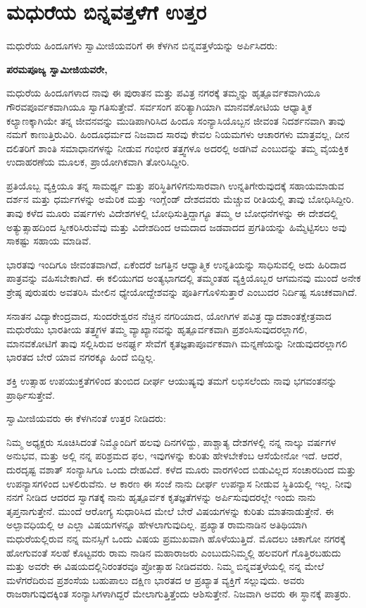 
\chapter{ಮಧುರೆಯ ಬಿನ್ನವತ್ತಳೆಗೆ ಉತ್ತರ}

ಮಧುರೆಯ ಹಿಂದೂಗಳು ಸ್ವಾಮೀಜಿಯವರಿಗೆ ಈ ಕೆಳಗಿನ ಬಿನ್ನವತ್ತಳೆಯನ್ನು ಅರ್ಪಿಸಿದರು:

\textbf{ಪರಮಪೂಜ್ಯ ಸ್ವಾಮೀಜಿಯವರೇ,}

ಮಧುರೆಯ ಹಿಂದೂಗಳಾದ ನಾವು ಈ ಪುರಾತನ ಮತ್ತು ಪವಿತ್ರ ನಗರಕ್ಕೆ ತಮ್ಮನ್ನು ಹೃತ್ಪೂರ್ವಕವಾಗಿಯೂ ಗೌರವಪೂರ್ವಕವಾಗಿಯೂ ಸ್ವಾಗತಿಸುತ್ತೇವೆ. ಸರ್ವಸಂಗ ಪರಿತ್ಯಾಗಿಯಾಗಿ ಮಾನವಕೋಟಿಯ ಆಧ್ಯಾತ್ಮಿಕ ಕಲ್ಯಾಣಕ್ಕಾಗಿಯೇ ತನ್ನ ಜೀವನವನ್ನು ಮುಡಿಪಾಗಿರಿಸಿದ ಹಿಂದೂ ಸಂನ್ಯಾಸಿಯೊಬ್ಬನ ಜೀವಂತ ನಿದರ್ಶನವಾಗಿ ತಾವು ನಮಗೆ ಕಾಣುತ್ತಿರುವಿರಿ. ಹಿಂದೂಧರ್ಮದ ನಿಜವಾದ ಸಾರವು ಕೇವಲ ನಿಯಮಗಳು ಆಚಾರಗಳು ಮಾತ್ರವಲ್ಲ, ದೀನ ದಲಿತರಿಗೆ ಶಾಂತಿ ಸಮಾಧಾನಗಳನ್ನು ನೀಡುವ ಗಂಭೀರ ತತ್ತ್ವಗಳೂ ಅದರಲ್ಲಿ ಅಡಗಿವೆ ಎಂಬುದನ್ನು ತಮ್ಮ ವೈಯಕ್ತಿಕ ಉದಾಹರಣೆಯ ಮೂಲಕ, ಪ್ರಾಯೋಗಿಕವಾಗಿ ತೋರಿಸಿದ್ದೀರಿ.

ಪ್ರತಿಯೊಬ್ಬ ವ್ಯಕ್ತಿಯೂ ತನ್ನ ಸಾಮರ್ಥ್ಯ ಮತ್ತು ಪರಿಸ್ಥಿತಿಗಳಿಗನುಸಾರವಾಗಿ ಉನ್ನತಿಗೇರುವುದಕ್ಕೆ ಸಹಾಯಮಾಡುವ ದರ್ಶನ ಮತ್ತು ಧರ್ಮಗಳನ್ನು ಅಮೆರಿಕ ಮತ್ತು ಇಂಗ್ಲೆಂಡ್​ ದೇಶದವರು ಮೆಚ್ಚುವ ರೀತಿಯಲ್ಲಿ ತಾವು ಬೋಧಿಸಿದ್ದೀರಿ. ತಾವು ಕಳೆದ ಮೂರು ವರ್ಷಗಳು ವಿದೇಶಗಳಲ್ಲಿ ಬೋಧಿಸುತ್ತಿದ್ದಾಗ್ಯೂ ತಮ್ಮ ಆ ಬೋಧನೆಗಳನ್ನು ಈ ದೇಶದಲ್ಲಿ ಅತ್ಯುತ್ಸಾಹದಿಂದ ಸ್ವೀಕರಿಸಿರುವೆವು ಮತ್ತು ವಿದೇಶದಿಂದ ಆಮದಾದ ಜಡವಾದದ ಪ್ರಗತಿಯನ್ನು ಹಿಮ್ಮೆಟ್ಟಿಸಲು ಅವು ಸಾಕಷ್ಟು ಸಹಾಯ ಮಾಡಿವೆ.

ಭಾರತವು ಇಂದಿಗೂ ಜೀವಂತವಾಗಿದೆ, ಏಕೆಂದರೆ ಜಗತ್ತಿನ ಆಧ್ಯಾತ್ಮಿಕ ಉನ್ನತಿಯನ್ನು ಸಾಧಿಸುವಲ್ಲಿ ಅದು ಹಿರಿದಾದ ಪಾತ್ರವನ್ನು ವಹಿಸಬೇಕಾಗಿದೆ. ಈ ಕಲಿಯುಗದ ಅಂತ್ಯಭಾಗದಲ್ಲಿ ತಮ್ಮಂತಹ ವ್ಯಕ್ತಿಯೊಬ್ಬರ ಆಗಮನವು ಮುಂದೆ ಅನೇಕ ಶ್ರೇಷ್ಠ ಪುರುಷರು ಅವತರಿಸಿ ಮೇಲಿನ ಧ್ಯೇಯೋದ್ದೇಶವನ್ನು ಪೂರ್ತಿಗೊಳಿಸುತ್ತಾರೆ ಎಂಬುದರ ನಿರ್ದಿಷ್ಟ ಸೂಚಕವಾಗಿದೆ.

\newpage

ಸನಾತನ ವಿದ್ಯಾಕೇಂದ್ರವಾದ, ಸುಂದರೇಶ್ವರನ ನೆಚ್ಚಿನ ನಗರಿಯಾದ, ಯೋಗಿಗಳ ಪವಿತ್ರ ದ್ವಾದಶಾಂತಕ್ಷೇತ್ರವಾದ ಮಧುರೆಯು ಭಾರತೀಯ ತತ್ತ್ವಗಳ ತಮ್ಮ ವ್ಯಾಖ್ಯಾನವನ್ನು ಹೃತ್ಪೂರ್ವಕವಾಗಿ ಪ್ರಶಂಸಿಸುವುದರಲ್ಲಾಗಲಿ, ಮಾನವಕೋಟಿಗೆ ತಾವು ಸಲ್ಲಿಸಿರುವ ಅನರ್ಘ್ಯ ಸೇವೆಗೆ ಕೃತಜ್ಞತಾಪೂರ್ವಕವಾಗಿ ಮನ್ನಣೆಯನ್ನು ನೀಡುವುದರಲ್ಲಾಗಲಿ ಭಾರತದ ಬೇರೆ ಯಾವ ನಗರಕ್ಕೂ ಹಿಂದೆ ಬಿದ್ದಿಲ್ಲ.

ಶಕ್ತಿ ಉತ್ಸಾಹ ಉಪಯುಕ್ತತೆಗಳಿಂದ ತುಂಬಿದ ದೀರ್ಘ ಆಯುಷ್ಯವು ತಮಗೆ ಲಭಿಸಲೆಂದು ನಾವು ಭಗವಂತನನ್ನು ಪ್ರಾರ್ಥಿಸುತ್ತೇವೆ.

ಸ್ವಾಮೀಜಿಯವರು ಈ ಕೆಳಗಿನಂತೆ ಉತ್ತರ ನೀಡಿದರು:

ನಿಮ್ಮ ಅಧ್ಯಕ್ಷರು ಸೂಚಿಸಿದಂತೆ ನಿಮ್ಮೊಂದಿಗೆ ಹಲವು ದಿನಗಳಿದ್ದು, ಪಾಶ್ಚಾತ್ಯ ದೇಶಗಳಲ್ಲಿ ನನ್ನ ನಾಲ್ಕು ವರ್ಷಗಳ ಅನುಭವ, ಮತ್ತು ಅಲ್ಲಿ ನನ್ನ ಪರಿಶ್ರಮದ ಫಲ, ಇವುಗಳನ್ನು ಕುರಿತು ಹೇಳಬೇಕೆಂಬ ಆಸೆಯೇನೋ ಇದೆ. ಆದರೆ, ದುರದೃಷ್ಟ ವಶಾತ್​ ಸಂನ್ಯಾಸಿಗೂ ಒಂದು ದೇಹವಿದೆ. ಕಳೆದ ಮೂರು ವಾರಗಳಿಂದ ಬಿಡುವಿಲ್ಲದ ಸಂಚಾರದಿಂದ ಮತ್ತು ಉಪನ್ಯಾಸಗಳಿಂದ ಬಳಲಿರುವೆನು. ಆ ಕಾರಣ ಈ ಸಂಜೆ ನಾನು ದೀರ್ಘ ಉಪನ್ಯಾಸ ನೀಡುವ ಸ್ಥಿತಿಯಲ್ಲಿ ಇಲ್ಲ. ನೀವು ನನಗೆ ನೀಡಿದ ಆದರದ ಸ್ವಾಗತಕ್ಕೆ ನಾನು ಹೃತ್ಪೂರ್ವಕ ಕೃತಜ್ಞತೆಗಳನ್ನು ಅರ್ಪಿಸುವುದರಲ್ಲೇ ಇಂದು ನಾನು ತೃಪ್ತನಾಗುತ್ತೇನೆ. ಮುಂದೆ ಆರೋಗ್ಯ ಸುಧಾರಿಸಿದ ಮೇಲೆ ಬೇರೆ ವಿಷಯಗಳನ್ನು ಕುರಿತು ಮಾತನಾಡುತ್ತೇನೆ. ಈ ಅಲ್ಪಾವಧಿಯಲ್ಲಿ ಆ ಎಲ್ಲಾ ವಿಷಯಗಳನ್ನೂ ಹೇಳಲಾಗುವುದಿಲ್ಲ. ಪ್ರಖ್ಯಾತ ರಾಮನಾಡಿನ ಅತಿಥಿಯಾಗಿ ಮಧುರೆಯಲ್ಲಿರುವ ನನ್ನ ಮನಸ್ಸಿಗೆ ಒಂದು ವಿಷಯ ಪ್ರಮುಖವಾಗಿ ಹೊಳೆಯುತ್ತಿದೆ. ಮೊದಲು ಚಿಕಾಗೋ ನಗರಕ್ಕೆ ಹೋಗುವಂತೆ ಸಲಹೆ ಕೊಟ್ಟವರು ರಾಮ ನಾಡಿನ ಮಹಾರಾಜರು ಎಂಬುದು\break ನಿಮ್ಮಲ್ಲಿ ಹಲವರಿಗೆ ಗೊತ್ತಿರಬಹುದು ಮತ್ತು ಅವರೇ ಈ ವಿಷಯ\-ದಲ್ಲಿ\break ನಿರಂತರವೂ ಪ್ರೋತ್ಸಾಹ ನೀಡಿದವರು. ನಿಮ್ಮ ಬಿನ್ನವತ್ತಳೆಯಲ್ಲಿ ನನ್ನ ಮೇಲೆ ಮಳೆಗರೆದಿರುವ ಪ್ರಶಂಸೆಯ ಬಹುಪಾಲು ದಕ್ಷಿಣ ಭಾರತದ ಆ ಪ್ರಖ್ಯಾತ ವ್ಯಕ್ತಿಗೆ ಸಲ್ಲುವುದು. ಅವರು ರಾಜರಾಗುವುದಕ್ಕಿಂತ ಸಂನ್ಯಾಸಿಗಳಾಗಿದ್ದರೆ ಮೇಲಾಗುತ್ತಿತ್ತೆಂದು ಆಶಿಸುತ್ತೇನೆ. ನಿಜವಾಗಿ ಅವರು ಈ ಸ್ಥಾನಕ್ಕೆ ಪಾತ್ರರು.

